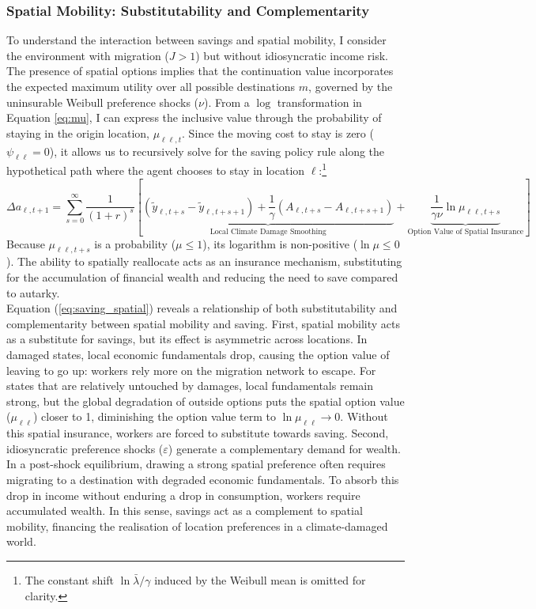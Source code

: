 \documentclass[12pt, a4paper]{article}
\begin{document}
\subsubsection*{Spatial Mobility: Substitutability and Complementarity}
To understand the interaction between savings and spatial mobility, I consider the environment with migration ($J > 1$) but without idiosyncratic income risk. The presence of spatial options implies that the continuation value incorporates the expected maximum utility over all possible destinations $m$, governed by the uninsurable Weibull preference shocks ($\nu$). From a $\log$ transformation in Equation \ref{eq:mu}, I can express the inclusive value through the probability of staying in the origin location, $\mu_{\ell \ell, t}$. Since the moving cost to stay is zero ($\psi_{\ell\ell} = 0$), it allows us to recursively solve for the saving policy rule along the hypothetical path where the agent chooses to stay in location $\ell$:\footnote{The constant shift $\ln\bar{\lambda}/\gamma$ induced by the Weibull mean is omitted for clarity.}
\begin{equation}
    \Delta a_{\ell, t+1} = \sum_{s=0}^{\infty} \frac{1}{(1+r)^s} \left[ \underbrace{(\tilde{y}_{\ell, t+s} - \tilde{y}_{\ell, t+s+1}) + \frac{1}{\gamma} (A_{\ell, t+s} - A_{\ell, t+s+1})}_{\text{Local Climate Damage Smoothing}} + \underbrace{\frac{1}{\gamma \nu} \ln \mu_{\ell  \ell, t+s}}_{\text{Option Value of Spatial Insurance}} \right]
    \label{eq:saving_spatial}
\end{equation}
Because $\mu_{\ell \ell, t+s}$ is a probability ($\mu \le 1$), its logarithm is non-positive ($\ln \mu \le 0$). The ability to spatially reallocate acts as an insurance mechanism, substituting for the accumulation of financial wealth and reducing the need to save compared to autarky. \\

Equation (\ref{eq:saving_spatial}) reveals a relationship of both substitutability and complementarity between spatial mobility and saving. First, spatial mobility acts as a substitute for savings, but its effect is asymmetric across locations. In damaged states, local economic fundamentals drop, causing the option value of leaving to go up: workers rely more on the migration network to escape. For states that are relatively untouched by damages, local fundamentals remain strong, but the global degradation of outside options puts the spatial option value ($\mu_{\ell \ell}$) closer to 1, diminishing the option value term to $\ln \mu_{\ell \ell} \to 0$. Without this spatial insurance, workers are forced to substitute towards saving. Second, idiosyncratic preference shocks ($\varepsilon$) generate a complementary demand for wealth. In a post-shock equilibrium, drawing a strong spatial preference often requires migrating to a destination with degraded economic fundamentals. To absorb this drop in income without enduring a drop in consumption, workers require accumulated wealth. In this sense, savings act as a complement to spatial mobility, financing the realisation of location preferences in a climate-damaged world.
\end{document}
